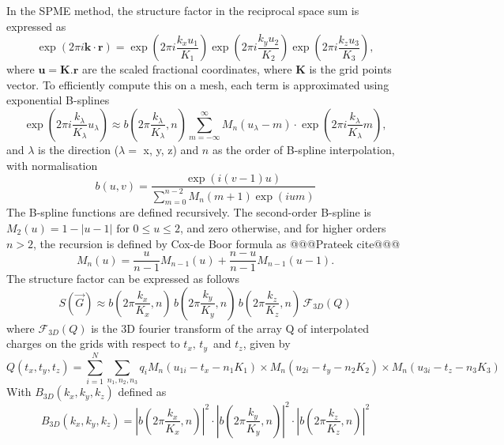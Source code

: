 In the SPME method, the structure factor in the reciprocal space sum is expressed as
\begin{equation}
\exp(2\pi i \mathbf{k} \cdot \mathbf{r}) =
\exp\left(2\pi i \frac{k_x u_1}{K_1} \right)
\exp\left(2\pi i \frac{k_y u_2}{K_2} \right)
\exp\left(2\pi i \frac{k_z u_3}{K_3} \right),
\end{equation}
where $\mathbf{u} = \mathbf{K}.\mathbf{r}$ are the scaled fractional coordinates, where $\mathbf{K}$ is the grid points vector. To efficiently compute this on a mesh, each term is approximated using exponential B-splines
\begin{equation}
    \exp\left(2\pi i \frac{k_\lambda}{K_\lambda} u_\lambda\right) \approx 
    b \left(2\pi \frac{k_\lambda}{K_\lambda},n\right) \sum_{m=-\infty}^{\infty} M_n(u_\lambda - m) 
    \cdot \exp\left(2\pi i \frac{k_\lambda}{K_\lambda} m\right),\label{eq:bspline}
\end{equation}
and $\lambda$ is the direction ($\lambda = $ x, y, z) and $n$ as the order of B-spline interpolation, with normalisation
\begin{equation}
    b(u,v) = \frac{\exp\left(i (v - 1) u\right)}
       {\sum_{m=0}^{n-2} M_n(m+1) \exp\left(i um\right)}
\end{equation}
The B-spline functions are defined recursively. The second-order B-spline is 
$M_2(u) = 
1 - |u - 1| \text{ for } 0 \le u \le 2$, and zero otherwise, and for higher orders \( n > 2 \), the recursion is defined by Cox-de Boor formula as @@@Prateek cite@@@
\begin{equation}
M_n(u) = \frac{u}{n-1} M_{n-1}(u) + \frac{n - u}{n - 1} M_{n-1}(u - 1).
\end{equation}
The structure factor can be expressed as follows
\begin{equation}
    S(\vec{G}) \approx b\left(2\pi \frac{k_x}{K_x},n\right)\,b\left(2\pi \frac{k_y}{K_y},n\right)\,b\left(2\pi \frac{k_z}{K_z},n\right) \, \mathcal{F}_{3D}(Q)
\end{equation}
where $\mathcal{F}_{3D}(Q)$ is the 3D fourier transform of the array Q of interpolated charges on the grids with respect to $t_x,\,t_y\,$ and $t_z$, given by
\begin{equation}
    Q(t_x, t_y, t_z) =  \sum_{i=1}^{N} \sum_{n_1, n_2, n_3} q_i M_n(u_{1i} - t_x - n_1 K_1) \times M_n(u_{2i} - t_y - n_2 K_2) \times M_n(u_{3i} - t_z - n_3 K_3)
\end{equation}
With $ B_{3D}(k_x, k_y, k_z)$ defined as $$ B_{3D}(k_x, k_y, k_z) = \left| b\left(2\pi \frac{k_x}{K_x},n\right) \right|^2 \cdot \left| b\left(2\pi \frac{k_y}{K_y},n\right) \right|^2 \cdot \left| b\left(2\pi \frac{k_z}{K_z},n\right) \right|^2$$
